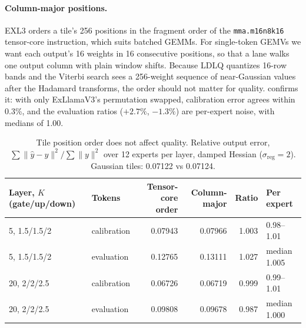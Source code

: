 \documentclass[10pt]{article}
\begin{document}
\paragraph{Column-major positions.}
EXL3 orders a tile's 256 positions in the fragment order of the \texttt{mma.m16n8k16} tensor-core instruction, which
suits batched GEMMs. For single-token GEMVs we want each output's 16 weights in 16 consecutive positions, so that a
lane walks one output column with plain window shifts. Because LDLQ quantizes 16-row bands and the Viterbi search sees a
256-weight sequence of near-Gaussian values after the Hadamard transforms, the order should not matter for quality.
 confirms it: with only ExLlamaV3's permutation swapped, calibration error agrees within 0.3\%, and the
evaluation ratios ($+2.7\%$, $-1.3\%$) are per-expert noise, with medians of 1.00.

\begin{table}[t]
\centering\small
\begin{tabular}{@{}llrrrl@{}}
\toprule
Layer, $K$ (gate/up/down) & Tokens & Tensor-core order & Column-major & Ratio & Per expert \\
\midrule
5, 1.5/1.5/2 & calibration & 0.07943 & 0.07966 & 1.003 & 0.98--1.01 \\
5, 1.5/1.5/2 & evaluation & 0.12765 & 0.13111 & 1.027 & median 1.005 \\
20, 2/2/2.5 & calibration & 0.06726 & 0.06719 & 0.999 & 0.99--1.01 \\
20, 2/2/2.5 & evaluation & 0.09808 & 0.09678 & 0.987 & median 1.000 \\
\bottomrule
\end{tabular}
\caption{Tile position order does not affect quality. Relative output error, $\sum \lVert \hat y - y\rVert^2 / \sum
\lVert y\rVert^2$ over 12 experts per layer, damped Hessian ($\sigma_{\text{reg}} = 2$). Gaussian tiles: 0.07122 vs
0.07124.}
\label{tab:order}
\end{table}
\end{document}
